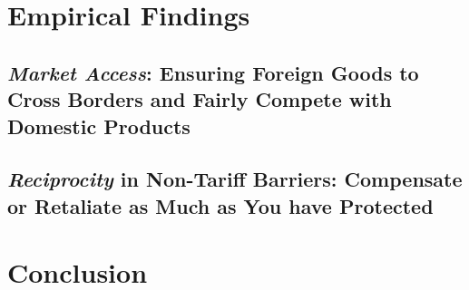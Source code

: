 \documentclass[12pt,letterpaper]{article}
\begin{document}
\section{Empirical Findings} %


\subsection{\textit{Market Access}: Ensuring Foreign Goods to Cross Borders and Fairly Compete with Domestic Products}


\subsection{\textit{Reciprocity} in Non-Tariff Barriers: Compensate or Retaliate as Much as You have Protected}




% 

% 

\section{Conclusion}


\clearpage 
\end{document}
